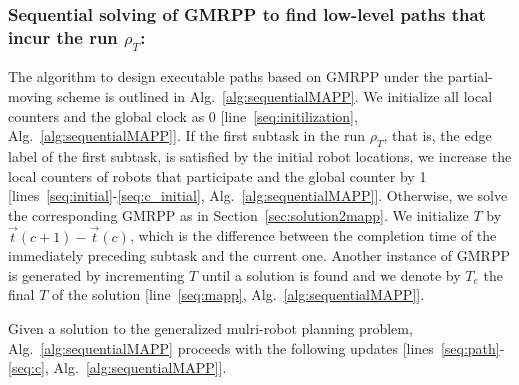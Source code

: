 \documentclass[Afour,sageh,times]{sagej}
\newcommand{\vertex}[1]{v_{\textup{#1}}}
\begin{document}
{{\begin{algorithm}[!t]
{{{          }
        }
      }
\end{algorithm}}

 \subsubsection{Sequential solving of  GMRPP to find low-level paths that incur the run $\rho_T$:}
The algorithm to design executable paths based on GMRPP under the  partial-moving scheme is outlined in Alg.~\ref{alg:sequentialMAPP}.  We initialize all local counters and the global clock as 0 [line~\ref{seq:initilization}, Alg.~\ref{alg:sequentialMAPP}].
If the first subtask in the run $\rho_T$, that is, the edge label of the first subtask,  is satisfied by the initial  robot locations, we increase the local counters of robots that participate  and the global counter by 1 [lines~\ref{seq:initial}-\ref{seq:c_initial}, Alg.~\ref{alg:sequentialMAPP}]. Otherwise, we solve the corresponding GMRPP as in Section~\ref{sec:solution2mapp}.  We initialize $T$ by $\vec{t}(c+1) - \vec{t}(c)$,  which is the difference between the completion time of the immediately preceding subtask and the current one. Another instance of GMRPP is generated by incrementing $T$ until a solution is found and we denote by $T_e$  the final $T$ of the solution [line~\ref{seq:mapp}, Alg.~\ref{alg:sequentialMAPP}]. {Given a solution to the generalized mulri-robot planning problem, Alg.~\ref{alg:sequentialMAPP} proceeds with the following updates [lines~\ref{seq:path}-\ref{seq:c}, Alg.~\ref{alg:sequentialMAPP}].

}}
\end{document}

